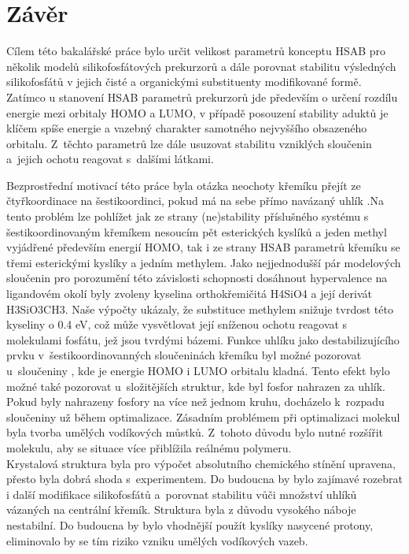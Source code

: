\documentclass[
  printed, %
  table,   %
  lof,     %
  lot,     %
  oneside,
]{fithesis3}
\begin{document}
  
  \chapter{Závěr}
Cílem této bakalářské práce bylo určit velikost parametrů konceptu HSAB pro několik modelů silikofosfátových prekurzorů a dále porovnat stabilitu výsledných silikofosfátů v jejich čisté a organickými substituenty modifikované formě.
Zatímco u stanovení HSAB parametrů prekurzorů jde především o určení rozdílu energie mezi orbitaly HOMO a LUMO, v případě posouzení stability aduktů je klíčem spíše energie a vazebný charakter samotného nejvyššího obsazeného orbitalu. Z~těchto parametrů lze dále usuzovat stabilitu vzniklých sloučenin a~jejich ochotu reagovat s~dalšími látkami. 

Bezprostřední motivací této práce byla otázka neochoty křemíku přejít ze čtyřkoordinace na šestikoordinci, pokud má na sebe přímo navázaný uhlík .Na tento problém lze  pohlížet jak ze strany (ne)stability příslušného  systému s šestikoordinovaným křemíkem nesoucím pět esterických kyslíků a jeden methyl vyjádřené především energií HOMO, tak i ze strany HSAB parametrů křemíku se třemi esterickými kyslíky a jedním methylem. 
Jako nejjednodušší pár modelových sloučenin pro porozumění této závislosti schopnosti dosáhnout hypervalence na ligandovém okolí byly zvoleny kyselina orthokřemičitá H4SiO4 a její derivát H3SiO3CH3. Naše výpočty ukázaly, že substituce methylem snižuje tvrdost této kyseliny o 0.4 eV, což může vysvětlovat její sníženou ochotu reagovat s molekulami fosfátu, jež jsou tvrdými bázemi. Funkce uhlíku jako destabilizujícího prvku v~šestikoordinovanných sloučeninách křemíku byl možné pozorovat u~sloučeniny , kde je energie HOMO i LUMO orbitalu kladná. Tento efekt bylo možné také pozorovat u~složitějších struktur, kde byl fosfor nahrazen za uhlík. Pokud byly nahrazeny fosfory na více než jednom kruhu, docházelo k~rozpadu sloučeniny už během optimalizace. Zásadním problémem při optimalizaci molekul byla tvorba umělých vodíkových můstků. Z~tohoto důvodu bylo nutné rozšířit molekulu, aby se situace více přiblížila reálnému polymeru. \\

Krystalová struktura byla pro výpočet absolutního chemického stínění upravena, přesto byla dobrá shoda s~experimentem. Do budoucna by bylo zajímavé rozebrat i další modifikace silikofosfátů a~porovnat stabilitu vůči množství uhlíků vázaných na centrální křemík. Struktura  byla z důvodu vysokého náboje nestabilní. Do budoucna by bylo vhodnější použít kyslíky nasycené protony, eliminovalo by se tím riziko vzniku umělých vodíkových vazeb.
  
\end{document}
